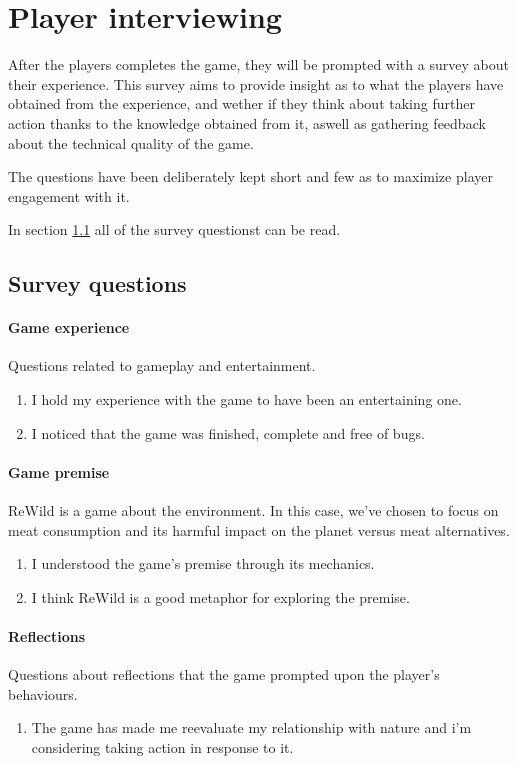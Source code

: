 \section{Player interviewing}
\label{sec:player-interviewing}

After the players completes the game, they will be prompted with a survey
about their experience. This survey aims to provide insight as to what
the players have obtained from the experience, and wether if they
think about taking further action thanks to the knowledge obtained from it, 
aswell as gathering feedback about the technical quality of the game.

The questions have been deliberately kept short and few as to maximize player
engagement with it.

In section \ref{sec:survey-questions} all of the survey questionst can be read.

\subsection{Survey questions}\label{sec:survey-questions}

\paragraph{Game experience}
Questions related to gameplay and entertainment.

\begin{enumerate}
\item I hold my experience with the game to have been an entertaining one.
\item I noticed that the game was finished, complete and free of bugs.
\end{enumerate}

\paragraph{Game premise}
ReWild is a game about the environment. In this case, we've chosen to focus on meat consumption and its harmful impact on the planet versus meat alternatives.

\begin{enumerate}
\item I understood the game's premise through its mechanics.
\item I think ReWild is a good metaphor for exploring the premise.
\end{enumerate}

\paragraph{Reflections}
Questions about reflections that the game prompted upon the player's behaviours.

\begin{enumerate}
\item The game has made me reevaluate my relationship with nature and i'm considering taking action in response to it.
\end{enumerate}
